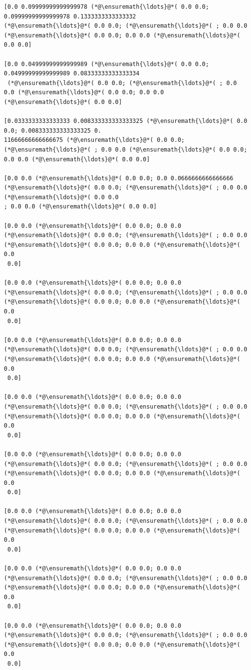 \documentclass[12pt,a4paper]{article}
\begin{document}
\begin{lstlisting}
[0.0 0.09999999999999978 (*@\ensuremath{\ldots}@*( 0.0 0.0; 0.09999999999999978 0.1333333333333332 
(*@\ensuremath{\ldots}@*( 0.0 0.0; (*@\ensuremath{\ldots}@*( ; 0.0 0.0 (*@\ensuremath{\ldots}@*( 0.0 0.0; 0.0 0.0 (*@\ensuremath{\ldots}@*( 0.0 0.0]

[0.0 0.04999999999999989 (*@\ensuremath{\ldots}@*( 0.0 0.0; 0.04999999999999989 0.08333333333333334
 (*@\ensuremath{\ldots}@*( 0.0 0.0; (*@\ensuremath{\ldots}@*( ; 0.0 0.0 (*@\ensuremath{\ldots}@*( 0.0 0.0; 0.0 0.0 (*@\ensuremath{\ldots}@*( 0.0 0.0]

[0.0333333333333333 0.008333333333333325 (*@\ensuremath{\ldots}@*( 0.0 0.0; 0.008333333333333325 0.
11666666666666675 (*@\ensuremath{\ldots}@*( 0.0 0.0; (*@\ensuremath{\ldots}@*( ; 0.0 0.0 (*@\ensuremath{\ldots}@*( 0.0 0.0; 0.0 0.0 (*@\ensuremath{\ldots}@*( 0.0 0.0]

[0.0 0.0 (*@\ensuremath{\ldots}@*( 0.0 0.0; 0.0 0.0666666666666666 (*@\ensuremath{\ldots}@*( 0.0 0.0; (*@\ensuremath{\ldots}@*( ; 0.0 0.0 (*@\ensuremath{\ldots}@*( 0.0 0.0
; 0.0 0.0 (*@\ensuremath{\ldots}@*( 0.0 0.0]

[0.0 0.0 (*@\ensuremath{\ldots}@*( 0.0 0.0; 0.0 0.0 (*@\ensuremath{\ldots}@*( 0.0 0.0; (*@\ensuremath{\ldots}@*( ; 0.0 0.0 (*@\ensuremath{\ldots}@*( 0.0 0.0; 0.0 0.0 (*@\ensuremath{\ldots}@*( 0.0
 0.0]

[0.0 0.0 (*@\ensuremath{\ldots}@*( 0.0 0.0; 0.0 0.0 (*@\ensuremath{\ldots}@*( 0.0 0.0; (*@\ensuremath{\ldots}@*( ; 0.0 0.0 (*@\ensuremath{\ldots}@*( 0.0 0.0; 0.0 0.0 (*@\ensuremath{\ldots}@*( 0.0
 0.0]

[0.0 0.0 (*@\ensuremath{\ldots}@*( 0.0 0.0; 0.0 0.0 (*@\ensuremath{\ldots}@*( 0.0 0.0; (*@\ensuremath{\ldots}@*( ; 0.0 0.0 (*@\ensuremath{\ldots}@*( 0.0 0.0; 0.0 0.0 (*@\ensuremath{\ldots}@*( 0.0
 0.0]

[0.0 0.0 (*@\ensuremath{\ldots}@*( 0.0 0.0; 0.0 0.0 (*@\ensuremath{\ldots}@*( 0.0 0.0; (*@\ensuremath{\ldots}@*( ; 0.0 0.0 (*@\ensuremath{\ldots}@*( 0.0 0.0; 0.0 0.0 (*@\ensuremath{\ldots}@*( 0.0
 0.0]

[0.0 0.0 (*@\ensuremath{\ldots}@*( 0.0 0.0; 0.0 0.0 (*@\ensuremath{\ldots}@*( 0.0 0.0; (*@\ensuremath{\ldots}@*( ; 0.0 0.0 (*@\ensuremath{\ldots}@*( 0.0 0.0; 0.0 0.0 (*@\ensuremath{\ldots}@*( 0.0
 0.0]

[0.0 0.0 (*@\ensuremath{\ldots}@*( 0.0 0.0; 0.0 0.0 (*@\ensuremath{\ldots}@*( 0.0 0.0; (*@\ensuremath{\ldots}@*( ; 0.0 0.0 (*@\ensuremath{\ldots}@*( 0.0 0.0; 0.0 0.0 (*@\ensuremath{\ldots}@*( 0.0
 0.0]

[0.0 0.0 (*@\ensuremath{\ldots}@*( 0.0 0.0; 0.0 0.0 (*@\ensuremath{\ldots}@*( 0.0 0.0; (*@\ensuremath{\ldots}@*( ; 0.0 0.0 (*@\ensuremath{\ldots}@*( 0.0 0.0; 0.0 0.0 (*@\ensuremath{\ldots}@*( 0.0
 0.0]

[0.0 0.0 (*@\ensuremath{\ldots}@*( 0.0 0.0; 0.0 0.0 (*@\ensuremath{\ldots}@*( 0.0 0.0; (*@\ensuremath{\ldots}@*( ; 0.0 0.0 (*@\ensuremath{\ldots}@*( 0.0 0.0; 0.0 0.0 (*@\ensuremath{\ldots}@*( 0.0
 0.0]
\end{lstlisting}
\end{document}
